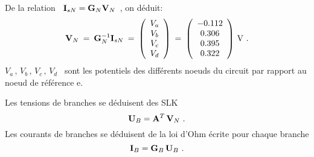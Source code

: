 
De la relation \ ${\bf I}_{sN} = {\bf G}_N {\bf V}_N$~, on déduit:
\[ {\bf V}_N \: = \: {\bf G}_N ^{-1} {\bf I}_{sN}\: = \: 
\left( \begin{array}{c} V_a \\ V_b \\ V_c \\ V_d \end{array} \right)
\: = \: \left( \begin{array}{c} -0.112 \\ 0.306 \\ 0.395 \\ 0.322
\end{array} \right) \, \text{V~.} \] 
$V_a\, , \, V_b\, , \,V_c\, , \,V_d$ \
sont les potentiels des différents noeuds du circuit par rapport au
noeud de référence e.


Les tensions de branches se déduisent des SLK
\[ {\bf U}_B = {\bf A}^T\, {\bf V}_N~. \]
Les courants de branches se déduisent de la loi d'Ohm écrite pour chaque branche
\[ {\bf I}_B = {\bf G}_B\, {\bf U}_B~. \]


